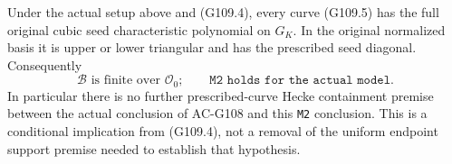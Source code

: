 \begin{theorem}
\label{AC-G109-M2}
Under the actual setup above and (G109.4), every curve
(G109.5) has the full original cubic seed characteristic
polynomial on \(G_K\).  In the original normalized basis
it is upper or lower triangular and has the prescribed
seed diagonal.  Consequently
\[
                 \mathscr B\text{ is finite over }\mathcal O_0;
                 \qquad\texttt{M2 holds for the actual model.}
 \tag{G109.12}
\]
In particular there is no further prescribed-curve Hecke
containment premise between the actual conclusion of
AC-G108 and this \texttt{M2} conclusion.  This is a conditional
implication from (G109.4), not a removal of the uniform
endpoint support premise needed to establish that hypothesis.
\end{theorem}

